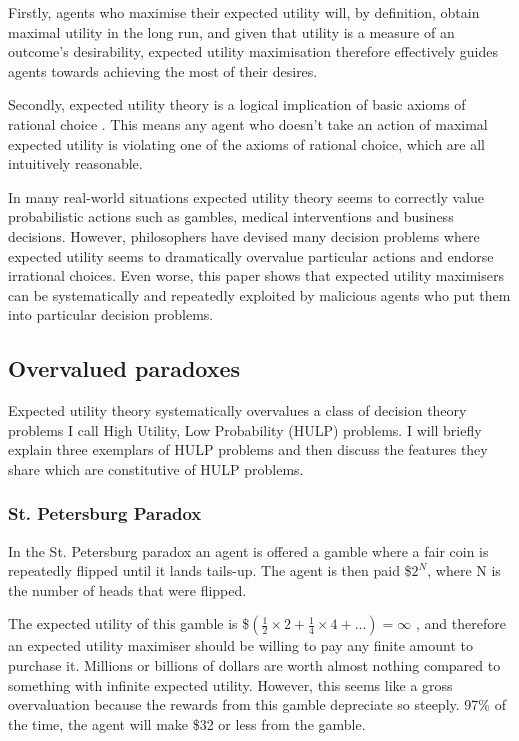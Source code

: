 \documentclass{article}
\begin{document}
Firstly, agents who maximise their expected utility will, by definition, obtain maximal utility in the long run, and given that utility is a measure of an outcome's desirability, expected utility maximisation therefore effectively guides agents towards achieving the most of their desires.

Secondly, expected utility theory is a logical implication of basic axioms of rational choice \citep{von1944games}. This means any agent who doesn't take an action of maximal expected utility is violating one of the axioms of rational choice, which are all intuitively reasonable.

In many real-world situations expected utility theory seems to correctly value probabilistic actions such as gambles, medical interventions and business decisions. However, philosophers have devised many decision problems where expected utility seems to dramatically overvalue particular actions and endorse irrational choices. Even worse, this paper shows that expected utility maximisers can be systematically and repeatedly exploited by malicious agents who put them into particular decision problems. 

\subsection {Overvalued paradoxes}

Expected utility theory systematically overvalues a class of decision theory problems I call High Utility, Low Probability (HULP) problems. I will briefly explain three exemplars of HULP problems and then discuss the features they share which are constitutive of HULP problems.

\subsubsection {St. Petersburg Paradox}

In the St. Petersburg paradox an agent is offered a gamble where a fair coin is repeatedly flipped until it lands tails-up. The agent is then paid \$\(2^N\), where N is the number of heads that were flipped. 

The expected utility of this gamble is \$\((\frac{1}{2}\times2 + \frac{1}{4}\times4+...) = \infty\) \citep{resnik1987choices}, and therefore an expected utility maximiser should be willing to pay any finite amount to purchase it. Millions or billions of dollars are worth almost nothing compared to something with infinite expected utility. However, this seems like a gross overvaluation because the rewards from this gamble depreciate so steeply. 97\% of the time, the agent will make \$32 or less from the gamble. 
\end{document}
